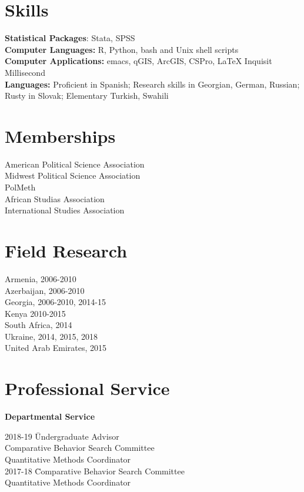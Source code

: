 \documentclass[margin,line]{res}
\begin{document}
{\begin{resume}
\section{\sc Skills} 
\textbf{Statistical Packages}:  Stata, SPSS \\
\textbf{Computer Languages:} R, Python, bash and Unix shell scripts \\
\textbf{Computer Applications:} emacs, qGIS, ArcGIS, CSPro,  \LaTeX
Inquisit Millisecond \\
\textbf{Languages:} Proficient in Spanish; Research skills in
  Georgian, German, Russian; Rusty in Slovak; Elementary Turkish,
  Swahili \\

\section{\sc Memberships}
American Political Science Association \\
Midwest Political Science Association\\
PolMeth\\
African Studias Association\\
International Studies Association

\section{\sc Field Research}
Armenia, 2006-2010  \\
Azerbaijan, 2006-2010\\
Georgia, 2006-2010, 2014-15 \\
Kenya 2010-2015 \\
South Africa, 2014 \\
Ukraine, 2014, 2015, 2018 \\
United Arab Emirates, 2015 \\


\section{\sc  Professional Service}
\textbf{Departmental Service}\\
\vspace{-3em}
\begin{tabbing}
2018-19    \=  Undergraduate Advisor\\
\> Comparative Behavior Search Committee\\
\> Quantitative Methods Coordinator \\
2017-18    \=  Comparative Behavior Search Committee\\
\> Quantitative Methods Coordinator
\end{tabbing}


\end{resume}}
\end{document}
